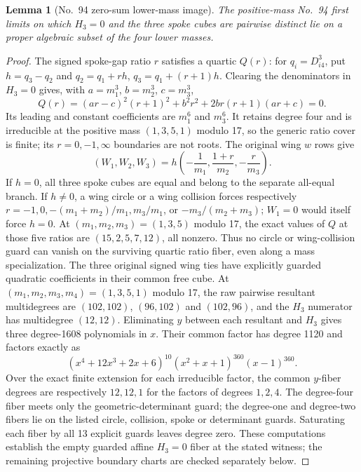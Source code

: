 \documentclass[11pt]{amsart}
\newtheorem{lemma}[theorem]{Lemma}
\theoremstyle{remark}
\begin{document}
\begin{lemma}[No.~94 zero-sum lower-mass image]\label{lem:no94-zero-sum}
The positive-mass No.~94 first limits on which $H_3=0$ and the three spoke cubes are pairwise distinct lie on a proper algebraic subset of the four lower masses.
\end{lemma}
\begin{proof}
The signed spoke-gap ratio $r$ satisfies a quartic $Q(r)$: for $q_i=D_{i4}^3$, put $h=q_3-q_2$ and $q_2=q_1+rh$, $q_3=q_1+(r+1)h$. Clearing the denominators in $H_3=0$ gives, with $a=m_1^3$, $b=m_2^3$, $c=m_3^3$,
\[
Q(r)=(ar-c)^2(r+1)^2+b^2r^2+2br(r+1)(ar+c)=0.
\]
Its leading and constant coefficients are $m_1^6$ and $m_3^6$. It retains degree four and is irreducible at the positive mass $(1,3,5,1)$ modulo 17, so the generic ratio cover is finite; its $r=0,-1,\infty$ boundaries are not roots. The original wing $w$ rows give
\[
(W_1,W_2,W_3)=h\left(-\frac1{m_1},\frac{1+r}{m_2},-\frac r{m_3}\right).
\]
If $h=0$, all three spoke cubes are equal and belong to the separate all-equal branch. If $h\ne0$, a wing circle or a wing collision forces respectively $r=-1,0,-(m_1+m_2)/m_1,m_3/m_1$, or $-m_3/(m_2+m_3)$; $W_1=0$ would itself force $h=0$. At $(m_1,m_2,m_3)=(1,3,5)$ modulo 17, the exact values of $Q$ at those five ratios are $(15,2,5,7,12)$, all nonzero. Thus no circle or wing-collision guard can vanish on the surviving quartic ratio fiber, even along a mass specialization. The three original signed wing ties have explicitly guarded quadratic coefficients in their common free cube. At $(m_1,m_2,m_3,m_4)=(1,3,5,1)$ modulo 17, the raw pairwise resultant multidegrees are $(102,102)$, $(96,102)$ and $(102,96)$, and the $H_3$ numerator has multidegree $(12,12)$. Eliminating $y$ between each resultant and $H_3$ gives three degree-1608 polynomials in $x$. Their common factor has degree 1120 and factors exactly as
\[
(x^4+12x^3+2x+6)^{10}(x^2+x+1)^{360}(x-1)^{360}.
\]
Over the exact finite extension for each irreducible factor, the common $y$-fiber degrees are respectively $12,12,1$ for the factors of degrees $1,2,4$. The degree-four fiber meets only the geometric-determinant guard; the degree-one and degree-two fibers lie on the listed circle, collision, spoke or determinant guards. Saturating each fiber by all 13 explicit guards leaves degree zero. These computations establish the empty guarded affine $H_3=0$ fiber at the stated witness; the remaining projective boundary charts are checked separately below.


\end{proof}
\end{document}
